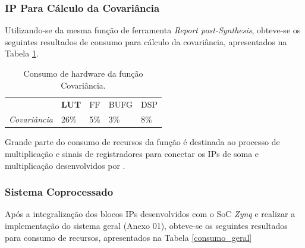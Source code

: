 \subsubsection{IP Para Cálculo da Covariância}
Utilizando-se da mesma função de ferramenta \textit{Report post-Synthesis}, obteve-se os seguintes resultados de consumo para cálculo da covariância, apresentados na Tabela \ref{consumo_cov}.

\begin{table}[!h]
	\centering
	\caption{Consumo de hardware da função Covariância.}
	\label{consumo_cov}
\begin{tabular}{lllll}
	\rowcolor[HTML]{ECF4FF} 
	\multicolumn{1}{c}{\cellcolor[HTML]{ECF4FF}\textbf{}} & \multicolumn{1}{c}{\cellcolor[HTML]{ECF4FF}\textbf{LUT}} & FF  & BUFG & DSP \\
	\textit{Covariância}                                  & 26\%                                                     & 5\% & 3\%  & 8\%
\end{tabular}
\end{table}

Grande parte do consumo de recursos da função é destinada ao processo de multiplicação e sinais de registradores para conectar os IPs de soma e multiplicação desenvolvidos por \cite{munoz2010tradeoff}.

\subsubsection{Sistema Coprocessado}

Após a integralização dos blocos IPs desenvolvidos com o SoC \textit{Zynq} e realizar a implementação do sistema geral (Anexo 01), obteve-se os seguintes resultados para consumo de recursos, apresentados na Tabela \ref{consumo_geral}

